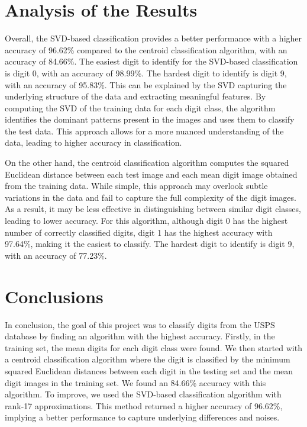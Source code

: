 \documentclass{article}
\begin{document}
\section{Analysis of the Results}

Overall, the SVD-based classification provides a better performance with a higher accuracy of 96.62\% compared to the centroid classification algorithm, with an accuracy of 84.66\%. The easiest digit to identify for the SVD-based classification is digit 0, with an accuracy of 98.99\%. The hardest digit to identify is digit 9, with an accuracy of 95.83\%. This can be explained by the SVD capturing the underlying structure of the data and extracting meaningful features. By computing the SVD of the training data for each digit class, the algorithm identifies the dominant patterns present in the images and uses them to classify the test data. This approach allows for a more nuanced understanding of the data, leading to higher accuracy in classification.

On the other hand, the centroid classification algorithm computes the squared Euclidean distance between each test image and each mean digit image obtained from the training data. While simple, this approach may overlook subtle variations in the data and fail to capture the full complexity of the digit images. As a result, it may be less effective in distinguishing between similar digit classes, leading to lower accuracy. For this algorithm, although digit 0 has the highest number of correctly classified digits, digit 1 has the highest accuracy with 97.64\%, making it the easiest to classify. The hardest digit to identify is digit 9, with an accuracy of 77.23\%.

\section{Conclusions}

In conclusion, the goal of this project was to classify digits from the USPS database by finding an algorithm with the highest accuracy. Firstly, in the training set, the mean digits for each digit class were found. We then started with a centroid classification algorithm where the digit is classified by the minimum squared Euclidean distances between each digit in the testing set and the mean digit images in the training set. We found an 84.66\% accuracy with this algorithm. To improve, we used the SVD-based classification algorithm with rank-17 approximations. This method returned a higher accuracy of 96.62\%, implying a better performance to capture underlying differences and noises.
\end{document}
